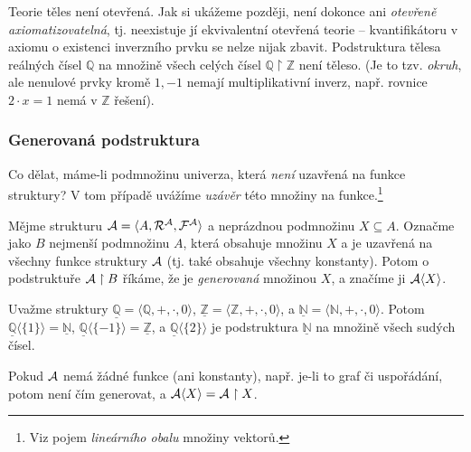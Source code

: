 \begin{example}
    Teorie těles není otevřená. Jak si ukážeme později, není dokonce ani \emph{otevřeně axiomatizovatelná}, tj. neexistuje jí ekvivalentní otevřená teorie -- kvantifikátoru v axiomu o existenci inverzního prvku se nelze nijak zbavit. Podstruktura tělesa reálných čísel $\mathbb Q$ na množině všech celých čísel $\mathbb Q\restriction\mathbb Z$ není těleso. (Je to tzv. \emph{okruh}, ale nenulové prvky kromě $1,-1$ nemají multiplikativní inverz, např. rovnice $2\cdot x=1$ nemá v $\mathbb Z$ řešení).
\end{example}

\subsubsection{Generovaná podstruktura}

Co dělat, máme-li podmnožinu univerza, která \emph{není} uzavřená na funkce struktury? V tom případě uvážíme \emph{uzávěr} této množiny na funkce.\footnote{Viz pojem \emph{lineárního obalu} množiny vektorů.}

\begin{definition}
    Mějme strukturu $\mathcal{A}=\langle A,\mathcal R^\mathcal A,\mathcal F^\mathcal A\rangle$ a neprázdnou podmnožinu $X\subseteq A$. Označme jako $B$ nejmenší podmnožinu $A$, která obsahuje množinu $X$ a je uzavřená na všechny funkce struktury $\mathcal{A}$ (tj. také obsahuje všechny konstanty). Potom o podstruktuře $\mathcal{A}\restriction B$ říkáme, že je \emph{generovaná} množinou $X$, a značíme ji $\mathcal{A}\langle X\rangle$.
\end{definition}

\begin{example}
    Uvažme struktury $\underline{\mathbb Q}=\langle\mathbb Q,+,\cdot,0\rangle$, $\underline{\mathbb Z}=\langle\mathbb Z,+,\cdot,0\rangle$, a $\underline{\mathbb N}=\langle\mathbb N,+,\cdot,0\rangle$. Potom $\underline{\mathbb Q}\langle\{1\}\rangle=\underline{\mathbb N}$, $\underline{\mathbb Q}\langle\{-1\}\rangle=\underline{\mathbb Z}$, a $\underline{\mathbb Q}\langle\{2\}\rangle$ je podstruktura $\underline{\mathbb N}$ na množině všech sudých čísel.
\end{example}

\begin{example}
    Pokud $\mathcal{A}$ nemá žádné funkce (ani konstanty), např. je-li to graf či uspořádání, potom není čím generovat, a $\mathcal{A}\langle X\rangle=\mathcal{A}\restriction X$.
\end{example}

